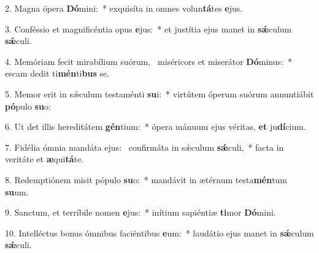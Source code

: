 2. Magna ópera \textbf{Dó}mini:~*  exquisíta in omnes volun\textbf{tá}tes \textbf{e}jus.\

3. Conféssio et magnificéntia opus \textbf{e}jus:~*  et justítia ejus manet in \textbf{sǽ}culum \textbf{sǽ}culi.\

4. Memóriam fecit mirabílium suórum, \dag\  miséricors et miserátor \textbf{Dó}minus:~*  escam dedit ti\textbf{mén}ti\textbf{bus} se.\

5. Memor erit in sǽculum testaménti \textbf{su}i:~*  virtútem óperum suórum annuntiábit \textbf{pó}pulo \textbf{su}o:\

6. Ut det illis hereditátem \textbf{gén}tium:~*  ópera mánuum ejus véritas, \textbf{et} ju\textbf{dí}cium.\

7. Fidélia ómnia mandáta ejus: \dag\  confirmáta in sǽculum \textbf{sǽ}culi,~*  facta in veritáte et \textbf{æ}qui\textbf{tá}te.\

8. Redemptiónem misit pópulo \textbf{su}o:~*  mandávit in ætérnum testa\textbf{mén}tum \textbf{su}um.\

9. Sanctum, et terríbile nomen \textbf{e}jus:~*  inítium sapiéntiæ \textbf{ti}mor \textbf{Dó}mini.\

10. Intelléctus bonus ómnibus faciéntibus \textbf{e}um:~*  laudátio ejus manet in \textbf{sǽ}culum \textbf{sǽ}culi.\

